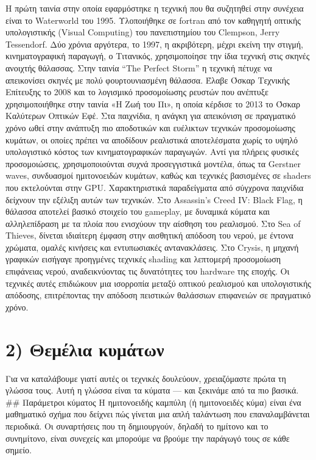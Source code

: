 \documentclass[a4paper, 11pt]{article}
\begin{document}
Η πρώτη ταινία στην οποία εφαρμόστηκε η τεχνική που θα συζητηθεί στην
συνέχεια είναι το Waterworld του 1995. Υλοποιήθηκε σε fortran από τον
καθηγητή οπτικής υπολογιστικής (Visual Computing) του πανεπιστημίου του
Clempson, Jerry Tessendorf. Δύο χρόνια αργότερα, το 1997, η ακριβότερη,
μέχρι εκείνη την στιγμή, κινηματογραφική παραγωγή, ο Τιτανικός,
χρησιμοποίησε την ίδια τεχνική στις σκηνές ανοιχτής θάλασσας. Στην
ταινία ``The Perfect Storm'' η τεχνική πέτυχε να απεικονίσει σκηνές με
πολύ φουρτουνιασμένη θάλασσα. Έλαβε Όσκαρ Τεχνικής Επίτευξης το 2008 και
το λογισμικό προσομοίωσης ρευστών που ανέπτυξε χρησιμοποιήθηκε στην
ταινία «Η Ζωή του Πι», η οποία κέρδισε το 2013 το Όσκαρ Καλύτερων
Οπτικών Εφέ. Στα παιχνίδια, η ανάγκη για απεικόνιση σε πραγματικό χρόνο
ωθεί στην ανάπτυξη πιο αποδοτικών και ευέλικτων τεχνικών προσομοίωσης
κυμάτων, οι οποίες πρέπει να αποδίδουν ρεαλιστικά αποτελέσματα χωρίς το
υψηλό υπολογιστικό κόστος των κινηματογραφικών παραγωγών. Αντί για
πλήρεις φυσικές προσομοιώσεις, χρησιμοποιούνται συχνά προσεγγιστικά
μοντέλα, όπως τα Gerstner waves, συνδυασμοί ημιτονοειδών κυμάτων, καθώς
και τεχνικές βασισμένες σε shaders που εκτελούνται στην GPU.
Χαρακτηριστικά παραδείγματα από σύγχρονα παιχνίδια δείχνουν την εξέλιξη
αυτών των τεχνικών. Στο Assassin's Creed IV: Black Flag, η θάλασσα
αποτελεί βασικό στοιχείο του gameplay, με δυναμικά κύματα και
αλληλεπίδραση με τα πλοία που ενισχύουν την αίσθηση του ρεαλισμού. Στο
Sea of Thieves, δίνεται ιδιαίτερη έμφαση στην αισθητική απόδοση του
νερού, με έντονα χρώματα, ομαλές κινήσεις και εντυπωσιακές
αντανακλάσεις. Στο Crysis, η μηχανή γραφικών εισήγαγε προηγμένες
τεχνικές shading και λεπτομερή προσομοίωση επιφάνειας νερού,
αναδεικνύοντας τις δυνατότητες του hardware της εποχής. Οι τεχνικές
αυτές επιδιώκουν μια ισορροπία μεταξύ οπτικού ρεαλισμού και
υπολογιστικής απόδοσης, επιτρέποντας την απόδοση πειστικών θαλάσσιων
επιφανειών σε πραγματικό χρόνο.

\section{2) Θεμέλια
κυμάτων}\label{ux3b8ux3b5ux3bcux3adux3bbux3b9ux3b1-ux3baux3c5ux3bcux3acux3c4ux3c9ux3bd}

Για να καταλάβουμε γιατί αυτές οι τεχνικές δουλεύουν, χρειαζόμαστε πρώτα
τη γλώσσα τους. Αυτή η γλώσσα είναι τα κύματα --- και ξεκινάμε από τα
πιο βασικά. \#\# Παράμετροι κύματος Η ημιτονοειδής καμπύλη (ή
ημιτονοειδές κύμα) είναι ένα μαθηματικό σχήμα που δείχνει πώς γίνεται
μια απλή ταλάντωση που επαναλαμβάνεται περιοδικά. Οι συναρτήσεις που τη
δημιουργούν, δηλαδή το ημίτονο και το συνημίτονο, είναι συνεχείς και
μπορούμε να βρούμε την παράγωγό τους σε κάθε σημείο.
\end{document}
